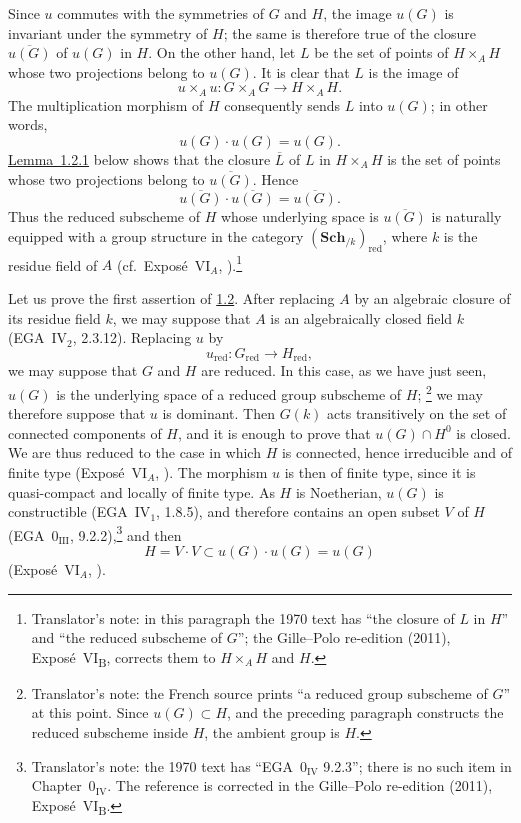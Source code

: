 Since \(u\) commutes with the symmetries of \(G\) and \(H\),
the image \(u(G)\) is invariant under the symmetry of \(H\); the same is
therefore true of the closure \(\overline{u(G)}\) of \(u(G)\) in \(H\). On the
other hand, let \(L\) be the set of points of \(H\times_A H\) whose
two projections belong to \(u(G)\). It is clear that \(L\) is the
image of
\[
  u\times_Au:G\times_A G\longrightarrow H\times_A H.
\]
The multiplication morphism of \(H\) consequently sends \(L\) into
\(u(G)\); in other words,
\[
  u(G)\cdot u(G)=u(G).
\]
\hyperref[lem:sga3-VIB-1.2.1]{Lemma~1.2.1} below shows that the closure \(\overline L\) of \(L\)
in \(H\times_AH\) is the set of points whose two projections belong
to \(\overline{u(G)}\). Hence
\[
  \overline{u(G)}\cdot\overline{u(G)}
    =\overline{u(G)}.
\]
Thus the reduced subscheme of \(H\) whose underlying space is
\(\overline{u(G)}\) is naturally equipped with a group structure in
the category \((\mathbf{Sch}_{/k})_{\mathrm{red}}\), where \(k\) is
the residue field of \(A\) (cf.\ Expos\'e~VI\(_A\), ).\footnote{Translator's
note: in this paragraph the 1970 text has ``the closure of \(L\) in \(H\)'' and ``the reduced subscheme
of \(G\)''; the Gille--Polo re-edition (2011), Expos\'e~VI\textsubscript{B}, corrects them to
\(H\times_AH\) and \(H\).}

Let us prove the first assertion of \hyperref[prop:sga3-VIB-1.2]{1.2}. After replacing \(A\) by
an algebraic closure of its residue field \(k\), we may suppose that
\(A\) is an algebraically closed field \(k\)
(EGA~IV\(_2\), 2.3.12). Replacing \(u\) by
\[
  u_{\mathrm{red}}:G_{\mathrm{red}}\longrightarrow H_{\mathrm{red}},
\]
we may suppose that \(G\) and \(H\) are reduced. In this case, as we
have just seen, \(u(G)\) is the underlying space of a reduced group
subscheme of \(H\);%
\begingroup
\renewcommand{\thefootnote}{\fnsymbol{footnote}}%
\footnote[1]{\label{note:sga3-VIB-1.2-image-ambient}Translator's
note: the French source prints ``a reduced group subscheme of \(G\)''
at this point. Since \(u(G)\subset H\), and the preceding paragraph
constructs the reduced subscheme inside \(H\), the ambient group is
\(H\).}%
\endgroup{}
we may therefore suppose that \(u\) is dominant. Then \(G(k)\) acts
transitively on the set of connected components of \(H\), and it is
enough to prove that \(u(G)\cap H^0\) is closed. We are thus reduced
to the case in which \(H\) is connected, hence irreducible and of
finite type (Expos\'e~VI\(_A\), ). The morphism \(u\) is then of
finite type, since it is quasi-compact and locally of finite type.
As \(H\) is Noetherian, \(u(G)\) is constructible
(EGA~IV\(_1\), 1.8.5), and therefore contains an open subset \(V\)
of \(H\) (EGA~0\(_{\mathrm{III}}\), 9.2.2),\footnote{Translator's note: the 1970 text has
``EGA~0\(_{\mathrm{IV}}\) 9.2.3''; there is no such item in Chapter~0\(_{\mathrm{IV}}\). The reference is
corrected in the Gille--Polo re-edition (2011), Expos\'e~VI\textsubscript{B}.} and then
\[
  H=V\cdot V\subset u(G)\cdot u(G)=u(G)
\]
(Expos\'e~VI\(_A\), ).

